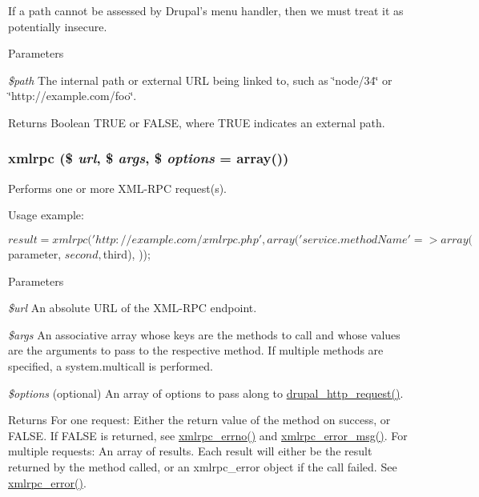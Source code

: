 If a path cannot be assessed by Drupal's menu handler, then we must treat it as potentially insecure.


\begin{DoxyParams}{Parameters}
\item[{\em \$path}]The internal path or external URL being linked to, such as \char`\"{}node/34\char`\"{} or \char`\"{}http://example.com/foo\char`\"{}.\end{DoxyParams}
\begin{DoxyReturn}{Returns}
Boolean TRUE or FALSE, where TRUE indicates an external path. 
\end{DoxyReturn}
\hypertarget{common_8inc_a66953a56d54712147cc383c1adb08dc3}{
\subsubsection[{xmlrpc}]{\setlength{\rightskip}{0pt plus 5cm}xmlrpc (\$ {\em url}, \/  \$ {\em args}, \/  \$ {\em options} = {\ttfamily array()})}}
\label{common_8inc_a66953a56d54712147cc383c1adb08dc3}
Performs one or more XML-\/RPC request(s).

Usage example: 
\begin{DoxyCode}
 $result = xmlrpc('http://example.com/xmlrpc.php', array(
   'service.methodName' => array($parameter, $second, $third),
 ));
\end{DoxyCode}



\begin{DoxyParams}{Parameters}
\item[{\em \$url}]An absolute URL of the XML-\/RPC endpoint. \item[{\em \$args}]An associative array whose keys are the methods to call and whose values are the arguments to pass to the respective method. If multiple methods are specified, a system.multicall is performed. \item[{\em \$options}](optional) An array of options to pass along to \hyperlink{group__http__handling_gaad3affacd718b960300dcdddefa518aa}{drupal\_\-http\_\-request()}.\end{DoxyParams}
\begin{DoxyReturn}{Returns}
For one request: Either the return value of the method on success, or FALSE. If FALSE is returned, see \hyperlink{xmlrpc_8inc_af9d29505279c00e66545f3859550ff88}{xmlrpc\_\-errno()} and \hyperlink{xmlrpc_8inc_abaf990108687e6e764164984306dbd55}{xmlrpc\_\-error\_\-msg()}. For multiple requests: An array of results. Each result will either be the result returned by the method called, or an xmlrpc\_\-error object if the call failed. See \hyperlink{xmlrpc_8inc_aabf20dbe18bd511ce0aceedc087a15fd}{xmlrpc\_\-error()}. 
\end{DoxyReturn}
